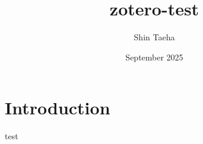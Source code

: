 \documentclass{article}
\title{zotero-test}
\author{Shin Taeha}
\date{September 2025}
\begin{document}
\maketitle

\section{Introduction}
test\autocite{Gritsenko22ApplSci}
\printbibliography
\end{document}
